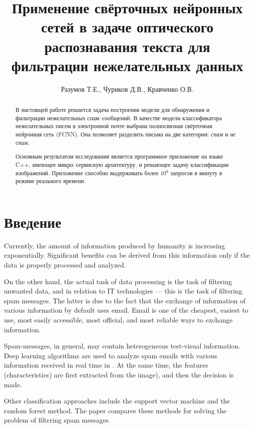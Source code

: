 \documentclass[12pt]{article}
\title{Применение свёрточных нейронных сетей в задаче оптического распознавания текста для фильтрации нежелательных данных}
\author{Разумов Т.Е., Чуриков Д.В., Кравченко О.В.}
\begin{document}
\maketitle

\begin{abstract}
В настоящей работе решается задача построения модели для обнаружения и фильтрации нежелательных спам--сообщений. В качестве модели классификатора нежелательных писем в электронной почте выбрана полносвязная свёрточная нейронная сеть (\textsf{FCNN}). Она позволяет разделить письма на две категории: \emph{спам} и \emph{не спам}. 

Основным результатом исследования является программное приложение на языке \textsf{C++}, имеющее микро--сервисную архитектуру, и решающее задачу классификации изображений. Приложение способно выдерживать более $10^6$ запросов в минуту в режиме реального времени.
\end{abstract}


\section{Введение}
Currently, the amount of information produced by humanity
is increasing exponentially. Significant benefits can be derived from this information only if the data is properly processed and analyzed.

On the other hand, the actual task of data processing is the task
of filtering unwanted data, and in relation to IT technologies --- this is the task of filtering spam messages.
The latter is due to the fact that the exchange of information of various information by default uses email. Email is one of the cheapest, easiest to use, most easily accessible, most official, and most reliable ways to exchange information.

Spam-messages, in general, may contain heterogeneous test-visual information. Deep
learning algorithms are used to analyze spam emails with various information received in real time in \cite{Makkar2021}.
At the same time, the features (characteristics) are first extracted from the image),
and then the decision is made.


Other classification approaches include the support vector machine and the random forest method. The paper \cite{Taylor2020} compares these methods for solving the problem of filtering spam messages.
\end{document}
